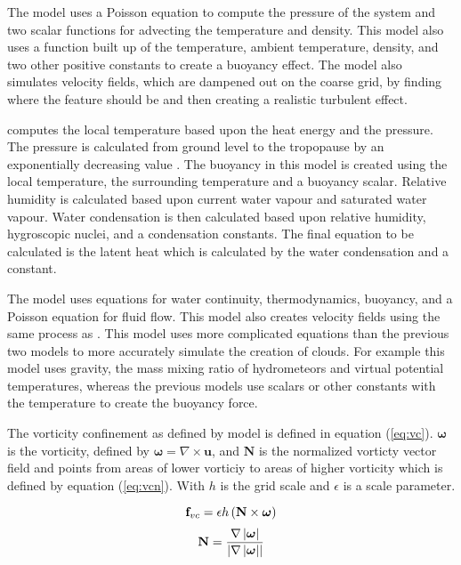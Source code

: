 The \citet*{Fedkiw01} model uses a Poisson equation to compute the pressure of the system and two scalar functions for advecting the temperature and density.
This model also uses a function built up of the temperature, ambient temperature, density, and two other positive constants to create a buoyancy effect.
The model also simulates velocity fields, which are dampened out on the coarse grid, by finding where the feature should be and then creating a realistic turbulent effect.

\citet*{DOverby02} computes the local temperature based upon the heat energy and the pressure.
The pressure is calculated from ground level to the tropopause by an exponentially decreasing value \citep*{DOverby02}.
The buoyancy in this model is created using the local temperature, the surrounding temperature and a buoyancy scalar.
Relative humidity is calculated based upon current water vapour and saturated water vapour.
Water condensation is then calculated based upon relative humidity, hygroscopic nuclei, and a condensation constants.
The final equation to be calculated is the latent heat which is calculated by the water condensation and a constant.
 
The \citet{HarrisEtAl03} model uses equations for water continuity, thermodynamics, buoyancy, and a Poisson equation for fluid flow.
This model also creates velocity fields using the same process as \citet*{Fedkiw01}.
This model uses more complicated equations than the previous two models to more accurately simulate the creation of clouds.
For example this model uses gravity, the mass mixing ratio of hydrometeors and virtual potential temperatures, whereas the previous models use scalars or other constants with the temperature to create the buoyancy force.

The vorticity confinement as defined by \citet{HarrisEtAl03} model is defined in equation (\ref{eq:vc}).
$\boldsymbol{\omega}$ is the vorticity, defined by $\boldsymbol{\omega} = \nabla\times\mathbf{u}$, and $\mathbf{N}$ is the normalized vorticty vector field and points from areas of lower vorticiy to areas of higher vorticity which is defined by equation (\ref{eq:vcn}).
With $h$ is the grid scale and $\epsilon$ is a scale parameter.

\begin{equation} \label{eq:vc}
  \centering
  \mathbf{f}_{vc} = \epsilon h\left(\mathbf{N}\times\boldsymbol{\omega}\right)
\end{equation}
\begin{equation} \label{eq:vcn}
  \centering
  \mathbf{N} = \frac{\nabla\left|\boldsymbol{\omega}\right|}{\left|\nabla\left|\boldsymbol{\omega}\right|\right|}
\end{equation}

